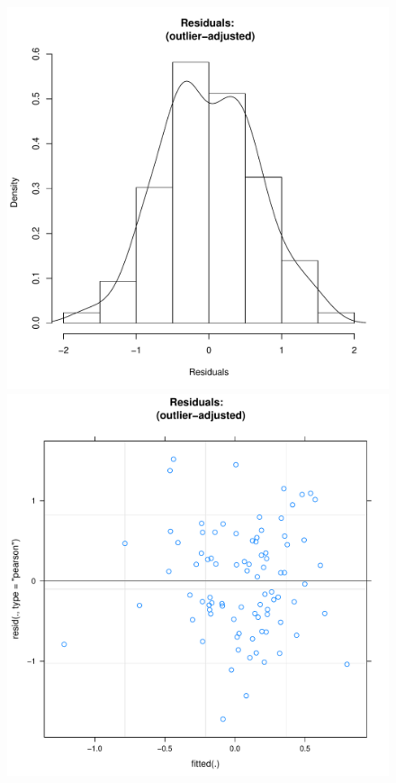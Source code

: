 \begin{CJK}{UTF8}{gbsn}
       \begin{figure}[htbp]
         \includegraphics[scale =.4]{images/MLM21bOutHist.pdf}
         \includegraphics[scale =.4]{images/MLM21bOutScatter.pdf}

\end{figure}
\end{CJK}
